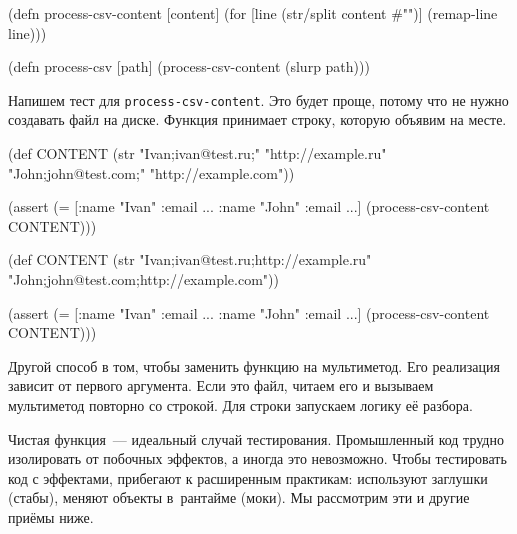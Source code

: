 \else

\begin{english}
  \begin{clojure}
(defn process-csv-content [content]
  (for [line (str/split content #"\n")]
    (remap-line line)))

(defn process-csv [path]
  (process-csv-content (slurp path)))
  \end{clojure}
\end{english}

\fi

Напишем тест для \verb|process-csv-content|. Это будет проще, потому что не
нужно создавать файл на диске. Функция принимает строку, которую объявим на
месте.

\ifx\DEVICETYPE\MOBILE

\begin{english}
  \begin{clojure}
(def CONTENT
  (str "Ivan;ivan@test.ru;"
       "http://example.ru"
       \newline
       "John;john@test.com;"
       "http://example.com"))

(assert
  (= [{:name "Ivan" :email ...}
      {:name "John" :email ...}]
     (process-csv-content CONTENT)))
  \end{clojure}
\end{english}

\else

\begin{english}
  \begin{clojure}
(def CONTENT
  (str "Ivan;ivan@test.ru;http://example.ru"
       \newline
       "John;john@test.com;http://example.com"))

(assert (= [{:name "Ivan" :email ...}
            {:name "John" :email ...}]
           (process-csv-content CONTENT)))
  \end{clojure}
\end{english}

\fi

Другой способ в том, чтобы заменить функцию на мультиметод. Его реализация
зависит от первого аргумента. Если это файл, читаем его и вызываем мультиметод
повторно со строкой. Для строки запускаем логику её разбора.

Чистая функция~--- идеальный случай тестирования. Промышленный код трудно
изолировать от побочных эффектов, а иногда это невозможно. Чтобы тестировать код
с эффектами, прибегают к расширенным практикам: используют заглушки (стабы),
меняют объекты в~рантайме (моки). Мы рассмотрим эти и другие приёмы ниже.

